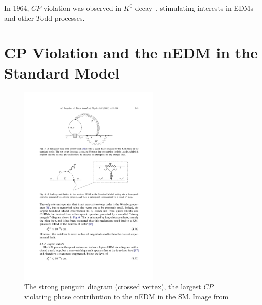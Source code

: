 In 1964, $CP$ violation was observed in $K^0$ decay~\cite{christenson_1964}, stimulating interests in EDMs and other $T$\textendash odd processes.


\section{CP Violation and the nEDM in the Standard Model}\label{sec:CP_violation_SM}


\begin{figure}[htp]
    \centering
    \includegraphics[width=0.6\textwidth]{figures/Pospelov_strong_penguin.pdf}
    \caption[The strong penguin diagram, the largest $CP$ violating phase contribution to the nEDM in the SM]
    {The strong penguin diagram (crossed vertex), the largest $CP$ violating phase contribution to the nEDM in the SM. Image from \cite{POS05}}
    \label{fig:strong_penguin}
\end{figure}

